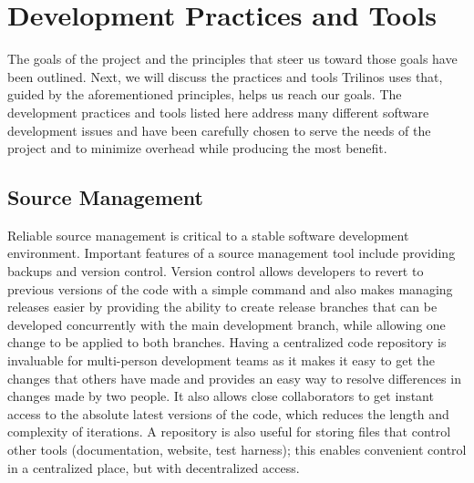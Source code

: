 \documentclass[12pt,relax]{article}
\begin{document}
\clearpage


\section{Development Practices and Tools}
\label{Section:DevelopmentPracticesTools}

The goals of the project and the principles that steer us toward those goals
have been outlined.  Next, we will discuss the practices and tools Trilinos
uses that, guided by the aforementioned principles, helps us reach our goals.
The development practices and tools listed here address many different software
development issues and have been carefully chosen to serve the needs of the
project and to minimize overhead while producing the most benefit.


\subsection{Source Management}


Reliable source management is critical to a stable software development
environment.  Important features of a source management tool include providing
backups and version control.  Version control allows developers to revert to
previous versions of the code with a simple command and also makes managing
releases easier by providing the ability to create release branches that can be
developed concurrently with the main development branch, while allowing one
change to be applied to both branches.  Having a centralized code repository is
invaluable for multi-person development teams as it makes it easy to get the
changes that others have made and provides an easy way to resolve differences
in changes made by two people.  It also allows close collaborators to get
instant access to the absolute latest versions of the code, which reduces the
length and complexity of iterations.  A repository is also useful for storing
files that control other tools (documentation, website, test harness); this
enables convenient control in a centralized place, but with decentralized access.
\end{document}
